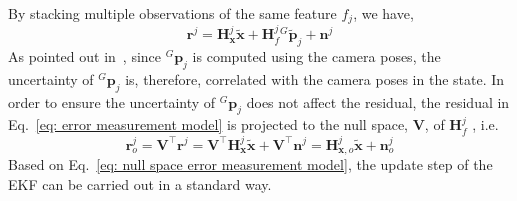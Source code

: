 By stacking multiple observations of the same feature $f_j$, we have,
\begin{equation*}
\mathbf{r}^j = 
\mathbf{H}_{\mathbf{x}}^j\tilde{\mathbf{x}} + 
\mathbf{H}_f^j {}^G\tilde{\mathbf{p}}_j + 
\mathbf{n}^j
\end{equation*}
As pointed out in~\cite{mourikis2007multi}, since ${}^G\mathbf{p}_j$ is computed using the camera poses, the uncertainty of ${}^G\mathbf{p}_j$ is, therefore, correlated with the camera poses in the state. In order to ensure the uncertainty of ${}^G\mathbf{p}_j$ does not affect the residual, the residual in Eq.~\eqref{eq: error measurement model} is projected to the null space, $\mathbf{V}$, of $\mathbf{H}_f^j$ , i.e.
\begin{equation}
\label{eq: null space error measurement model}
\mathbf{r}^j_o 
= \mathbf{V}^\top \mathbf{r}^j
= \mathbf{V}^\top \mathbf{H}_{\mathbf{x}}^j\tilde{\mathbf{x}} +
\mathbf{V}^\top \mathbf{n}^j
= \mathbf{H}_{\mathbf{x}, o}^j\tilde{\mathbf{x}} + 
\mathbf{n}^j_o
\end{equation}
Based on Eq.~\eqref{eq: null space error measurement model}, the update step of the EKF can be carried out in a standard way.
















